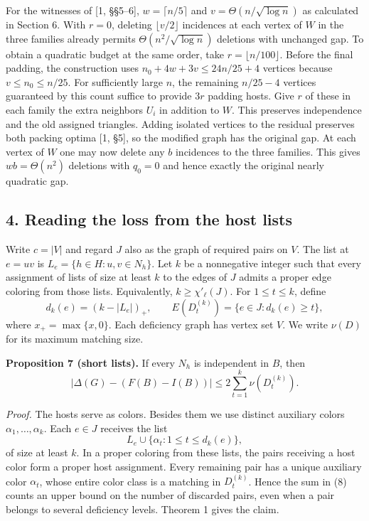 \documentclass[english,11pt,a4paper]{article}
\begin{document}
For the witnesses of {[}1, §§5--6{]}, \(w=\lceil n/5\rceil\) and \(v=\Theta(n/\sqrt{\log n})\) as calculated in Section 6. With \(r=0\), deleting \(\lfloor v/2\rfloor\) incidences at each vertex of \(W\) in the three families already permits \(\Theta(n^2/\sqrt{\log n})\) deletions with unchanged gap. To obtain a quadratic budget at the same order, take \(r=\lfloor n/100\rfloor\). Before the final padding, the construction uses \(n_0+4w+3v\le24n/25+4\) vertices because \(v\le n_0\le n/25\). For sufficiently large \(n\), the remaining \(n/25-4\) vertices guaranteed by this count suffice to provide \(3r\) padding hosts. Give \(r\) of these in each family the extra neighbors \(U_i\) in addition to \(W\). This preserves independence and the old assigned triangles. Adding isolated vertices to the residual preserves both packing optima {[}1, §5{]}, so the modified graph has the original gap. At each vertex of \(W\) one may now delete any \(b\) incidences to the three families. This gives \(wb=\Theta(n^2)\) deletions with \(q_0=0\) and hence exactly the original nearly quadratic gap.

\subsection{4. Reading the loss from the host lists}\label{reading-the-loss-from-the-host-lists}

Write \(c=|V|\) and regard \(J\) also as the graph of required pairs on \(V\). The list at \(e=uv\) is \(L_e=\{h\in H:u,v\in N_h\}\). Let \(k\) be a nonnegative integer such that every assignment of lists of size at least \(k\) to the edges of \(J\) admits a proper edge coloring from those lists. Equivalently, \(k\ge\chi'_\ell(J)\). For \(1\le t\le k\), define \[
d_k(e)=(k-|L_e|)_+,\qquad
E(D_t^{(k)})=\{e\in J:d_k(e)\ge t\},
\] where \(x_+=\max\{x,0\}\). Each deficiency graph has vertex set \(V\). We write \(\nu(D)\) for its maximum matching size.

\textbf{Proposition 7 (short lists).} If every \(N_h\) is independent in \(B\), then \[
|\Delta(G)-(F(B)-I(B))|\le 2\sum_{t=1}^{k}\nu(D_t^{(k)}). \tag{8}
\]

\emph{Proof.} The hosts serve as colors. Besides them we use distinct auxiliary colors \(\alpha_1,\ldots,\alpha_k\). Each \(e\in J\) receives the list \[
L_e\cup\{\alpha_t:1\le t\le d_k(e)\},
\] of size at least \(k\). In a proper coloring from these lists, the pairs receiving a host color form a proper host assignment. Every remaining pair has a unique auxiliary color \(\alpha_t\), whose entire color class is a matching in \(D_t^{(k)}\). Hence the sum in (8) counts an upper bound on the number of discarded pairs, even when a pair belongs to several deficiency levels. Theorem 1 gives the claim.
\end{document}
